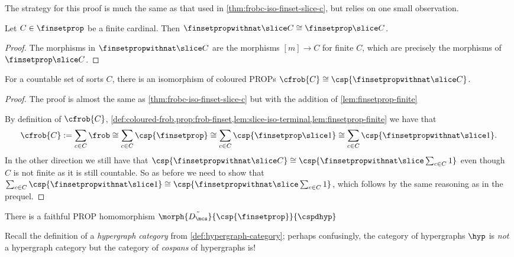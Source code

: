 The strategy for this proof is much the same as that used in
\cref{thm:frobc-iso-finset-slice-c}, but relies on one small observation.

\begin{lemma}
    \label{lem:finsetprop-finite}
    Let \(C \in \finsetprop\) be a finite cardinal.
    Then \(\finsetpropwithnat \slice C \cong \finsetprop \slice C\).
\end{lemma}
\begin{proof}
    The morphisms in \(\finsetpropwithnat \slice C\) are the morphisms
    \([m] \to C\) for finite \(C\), which are precisely the morphisms of
    \(\finsetprop \slice C\).
\end{proof}

\begin{theorem}
    \label{thm:frobc-iso-hatfinset-slice-c}
    For a countable set of sorts \(C\), there is an isomorphism of coloured
    PROPs \(\cfrob{C} \cong \csp{\finsetpropwithnat \slice C}\).
\end{theorem}
\begin{proof}
    The proof is almost the same as \cref{thm:frobc-iso-finset-slice-c} but with
    the addition of \cref{lem:finsetprop-finite}

    By definition of \(\cfrob{C}\),
    \cref{def:coloured-frob,prop:frob-finset,lem:slice-iso-terminal,lem:finsetprop-finite}
    we have that \[
        \cfrob{C}
        :=
        \sum_{c \in C}\frob
        \cong
        \sum_{c \in C}\csp{\finsetprop}
        \cong
        \sum_{c \in C}\csp{\finsetprop \slice 1}
        \cong
        \sum_{c \in C}\csp{\finsetpropwithnat \slice 1}.
    \]
    In the other direction we still have that \(
        \csp{\finsetpropwithnat \slice C}
        \cong
        \csp{\finsetpropwithnat \slice \sum_{c \in C} 1}
    \) even though \(C\) is not finite as it is still countable.
    So as before we need to show that \(
        \sum_{c \in C}\csp{\finsetpropwithnat \slice 1}
        \cong
        \csp{\finsetpropwithnat \slice \sum_{c \in C} 1}
    \), which follows by the same reasoning as in the prequel.
\end{proof}

\begin{corollary}
    There is a faithful PROP homomorphism
    \(\morph{\tilde{D_\mcs}}{\csp{\finsetprop}}{\cspdhyp}\)
\end{corollary}



Recall the definition of a \emph{hypergraph category} from
\cref{def:hypergraph-category}; perhaps confusingly, the category of hypergraphs
\(\hyp\) is \emph{not} a hypergraph category but the category of \emph{cospans}
of hypergraphs is!

